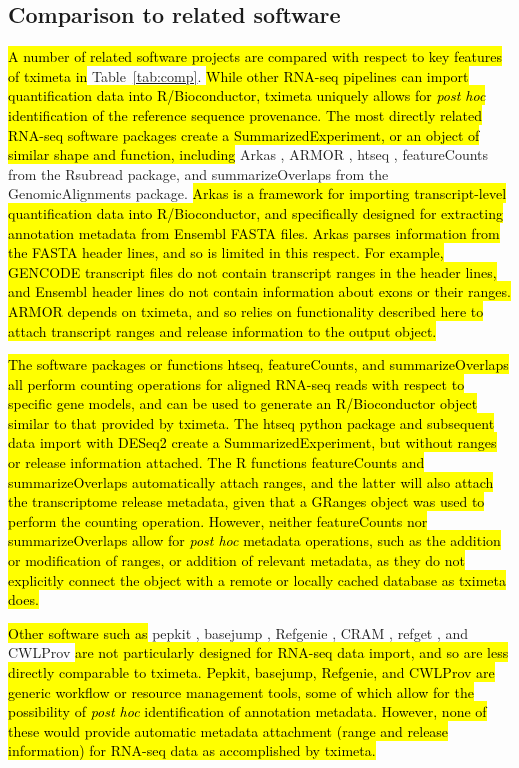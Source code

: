 \subsection*{Comparison to related software}

\hl{A number of related software projects are compared with respect to
  key features of tximeta in} Table~\ref{tab:comp}. \hl{While other
  RNA-seq pipelines can import quantification data into
  R/Bioconductor, tximeta uniquely allows for \textit{post hoc}
  identification of the reference sequence provenance.  The most
  directly related RNA-seq software packages create a
  SummarizedExperiment, or an object of similar shape and function,
  including}
Arkas \cite{arkas}, ARMOR \cite{Orjuelag2019}, htseq \cite{htseq},
featureCounts \cite{featurecounts} from the Rsubread package,
and summarizeOverlaps \cite{granges} from the GenomicAlignments
package.
\hl{Arkas is a framework for importing transcript-level quantification
  data into R/Bioconductor, and specifically designed for extracting
  annotation metadata from Ensembl FASTA files.
  Arkas parses information from the FASTA header lines, and so is
  limited in this respect. For example, GENCODE transcript files do
  not contain transcript ranges in the header lines, and Ensembl
  header lines do not contain information about exons or their ranges.
  ARMOR depends on tximeta, and so relies on functionality described
  here to attach transcript ranges and release information to the
  output object.}

\hl{The software packages or functions htseq, featureCounts, and
  summarizeOverlaps all 
  perform counting operations for aligned RNA-seq reads with
  respect to specific gene models, and can be used to generate an
  R/Bioconductor object similar to that provided by tximeta.  The
  htseq python package and subsequent data import with DESeq2 create a
  SummarizedExperiment, but without ranges or release information
  attached. The R functions featureCounts and summarizeOverlaps
  automatically attach ranges, and the latter will also attach the
  transcriptome release metadata, given that a GRanges object
  was used to perform the counting operation. However, neither
  featureCounts nor summarizeOverlaps allow for \textit{post hoc}
  metadata operations, such as the addition or modification of ranges,
  or addition of relevant metadata, as they do not explicitly connect
  the object with a remote or locally cached database as tximeta
  does.}

\hl{Other software such as}
pepkit \cite{pepkit}, basejump \cite{basejump},
Refgenie \cite{refgenie},
CRAM \cite{cram}, refget \cite{refget}, and
CWLProv \cite{Khan2018}
\hl{are not particularly designed for RNA-seq data import, and so are
  less directly comparable to tximeta. Pepkit, basejump, Refgenie, and
  CWLProv are generic workflow or resource management tools, some of
  which allow for the possibility of \textit{post hoc} identification
  of annotation metadata. However, none of these would provide
  automatic metadata attachment (range and release information) for
  RNA-seq data as accomplished by tximeta.}

